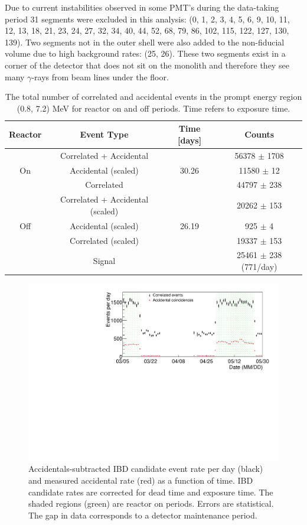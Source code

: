 Due to current instabilities observed in some PMT's during the data-taking period 31 segments were excluded in this analysis: (0, 1, 2, 3, 4, 5, 6, 9, 10, 11, 12, 13, 18, 21, 23, 24, 27, 32, 34, 40, 44, 52, 68, 79, 86, 102, 115, 122, 127, 130, 139).
Two segments not in the outer shell were also added to the non-fiducial volume due to high background rates: (25, 26).
These two segments exist in a corner of the detector that does not sit on the monolith and therefore they see many $\gamma$-rays from beam lines under the floor.

\begin{table}[H]
\begin{tabular}{|c|c|c|c|}
	\hline 
	\textbf{Reactor} & \textbf{Event Type} & \textbf{Time [days]} & \textbf{Counts} \\ 
	\hline 
	& Correlated + Accidental &  & 56378 $\pm$ 1708 \\ 
	On & Accidental (scaled) & 30.26 & 11580 $\pm$ 12 \\ 
	& Correlated &  & 44797 $\pm$ 238 \\ 
	\hline 
	& Correlated + Accidental (scaled) & & 20262 $\pm$ 153   \\ 
	Off &  Accidental (scaled) & 26.19  & 925 $\pm$ 4   \\ 
	& Correlated (scaled) & & 19337 $\pm$ 153 \\ 
	\hline 
	\hline 
	& Signal &  & 25461 $\pm$ 238 (771/day) \\ 
	\hline 
\end{tabular} 
\caption{The total number of correlated and accidental events in the prompt energy region (0.8, 7.2) MeV for reactor on and off periods. Time refers to exposure time.}
\label{tab:datastats}
\end{table}

\begin{figure}[H]
	\centering
	\includegraphics[width=0.9\linewidth]{tex/7-oscillation-images/EvtRates}
	\caption{Accidentals-subtracted IBD candidate event rate per day (black) and measured accidental rate (red) as a function of time. IBD candidate rates are corrected for dead time and exposure time. The shaded regions (green) are reactor on periods. Errors are statistical. The gap in data corresponds to a detector maintenance period.}
	\label{fig:evtrates}
\end{figure}


